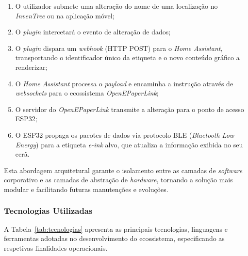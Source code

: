 \documentclass[10pt]{article}
\begin{document}
\begin{enumerate}
    \item O utilizador submete uma alteração do nome de uma localização no \textit{InvenTree} ou na aplicação móvel;
    \item O \textit{plugin} intercetará o evento de alteração de dados;
    \item O \textit{plugin} dispara um \textit{webhook} (HTTP POST) para o \textit{Home Assistant}, transportando o identificador único da etiqueta e o novo conteúdo gráfico a renderizar;
    \item O \textit{Home Assistant} processa o \textit{payload} e encaminha a instrução através de \textit{websockets} para o ecossistema \textit{OpenEPaperLink};
    \item O servidor do \textit{OpenEPaperLink} transmite a alteração para o ponto de acesso ESP32;
    \item O ESP32 propaga os pacotes de dados via protocolo BLE (\textit{Bluetooth Low Energy}) para a etiqueta \textit{e-ink} alvo, que atualiza a informação exibida no seu ecrã.
\end{enumerate}

Esta abordagem arquitetural garante o isolamento entre as camadas de \textit{software} corporativo e as camadas de abstração de \textit{hardware}, tornando a solução mais modular e facilitando futuras manutenções e evoluções.

\subsubsection{Tecnologias Utilizadas}

A Tabela~\ref{tab:tecnologias} apresenta as principais tecnologias, linguagens e ferramentas adotadas no desenvolvimento do ecossistema, especificando as respetivas finalidades operacionais.
\end{document}
